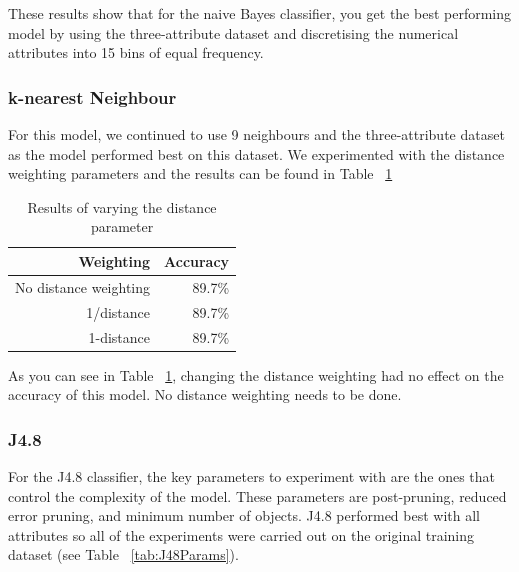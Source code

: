 \documentclass[a4paper,11pt]{article}
\begin{document}
These results show that for the naive Bayes classifier, you get the best performing model by using the three-attribute
dataset and discretising the numerical attributes into 15 bins of equal frequency.

\subsubsection{k-nearest Neighbour}

For this model, we continued to use 9 neighbours and the three-attribute dataset as the model performed best on this dataset.
We experimented with the distance weighting parameters and the results can be found in Table ~\ref{tab:kNNParams}

\begin{table}[H]
  \begin{center}
    \begin{tabular}{r | r}
      Weighting & Accuracy  \\ \hline
      No distance weighting & 89.7\% \\
      1/distance & 89.7\% \\
      1-distance & 89.7\% \\
    \end{tabular}
  \end{center}
  \caption{Results of varying the distance parameter}
  \label{tab:kNNParams}
\end{table}

As you can see in Table ~\ref{tab:kNNParams}, changing the distance weighting had no effect on the accuracy of this model.
No distance weighting needs to be done.

\subsubsection{J4.8}

For the J4.8 classifier, the key parameters to experiment with are the ones that control the complexity of the model.
These parameters are post-pruning, reduced error pruning, and minimum number of objects. J4.8 performed best with
all attributes so all of the experiments were carried out on the original training dataset (see Table ~\ref{tab:J48Params}).
\end{document}
